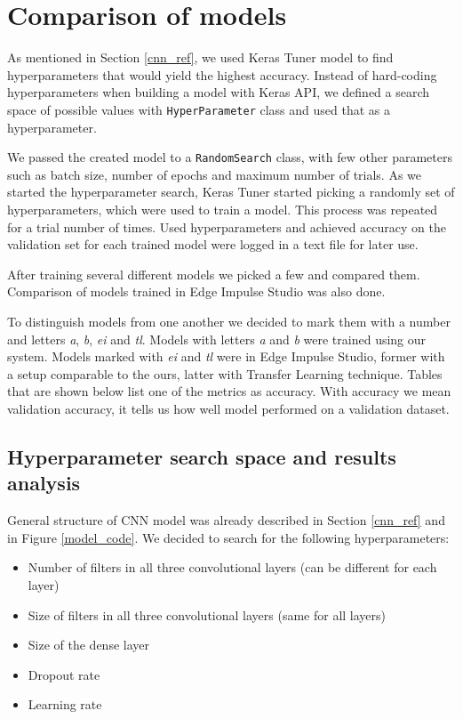 \section{ Comparison of models}\label{model_comparisons}

As mentioned in Section \ref{cnn_ref}, we used Keras Tuner model to find hyperparameters that would yield the highest accuracy.
Instead of hard-coding hyperparameters when building a model with Keras API, we defined a search space of possible values with \verb|HyperParameter| class and used that as a hyperparameter.

We passed the created model to a \verb|RandomSearch| class, with few other parameters such as batch size, number of epochs and maximum number of trials.
As we started the hyperparameter search, Keras Tuner started picking a randomly set of hyperparameters, which were used to train a model.
This process was repeated for a trial number of times.
Used hyperparameters and achieved accuracy on the validation set for each trained model were logged in a text file for later use.

After training several different models we picked a few and compared them.
Comparison of models trained in Edge Impulse Studio was also done.

To distinguish models from one another we decided to mark them with a number and letters \textit{a}, \textit{b}, \textit{ei} and \textit{tl}.
Models with letters \textit{a} and \textit{b} were trained using our system.
Models marked with \textit{ei} and \textit{tl} were in Edge Impulse Studio, former with a setup comparable to the ours, latter with Transfer Learning technique.
Tables that are shown below list one of the metrics as accuracy.
With accuracy we mean validation accuracy, it tells us how well model performed on a validation dataset.

\subsection{ Hyperparameter search space and results analysis}

General structure of CNN model was already described in Section \ref{cnn_ref} and in Figure \ref{model_code}.
We decided to search for the following hyperparameters: 

\begin{itemize}
    \item Number of filters in all three convolutional layers (can be different for each layer)
    \item Size of filters in all three convolutional layers (same for all layers)
    \item Size of the dense layer
    \item Dropout rate 
    \item Learning rate
\end{itemize}

